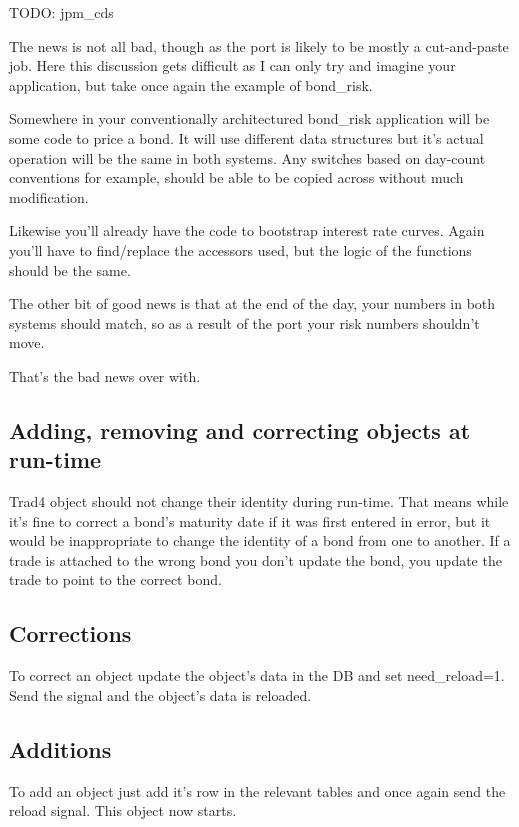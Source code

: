 \documentclass{report}
\begin{document}
TODO: jpm_cds

The news is not all bad, though as the port is likely to be mostly a cut-and-paste job. Here this discussion gets difficult as I can only try and imagine your application, but take once again the example of bond_risk.

Somewhere in your conventionally architectured bond_risk application will be some code to price a bond. It will use different data structures but it's actual operation will be the same in both systems. Any 
switches based on day-count conventions for example, should be able to be copied across without much modification.

Likewise you'll already have the code to bootstrap interest rate curves. Again you'll have to find/replace the accessors used, but the logic of the functions should be the same.

The other bit of good news is that at the end of the day, your numbers in both systems should match, so as a result of the port your risk numbers shouldn't move.

That's the bad news over with.

\subsection{Adding, removing and correcting objects at run-time}

Trad4 object should not change their identity during run-time. That means while it's fine to correct a bond's maturity date if it was first entered in error, but it would be inappropriate to change the identity of a bond from one to another. If a trade is attached to the wrong bond you don't update the bond, you update the trade to point to the correct bond.

\subsection{Corrections}

To correct an object update the object's data in the DB and set need_reload=1. Send the signal and the object's data is reloaded.

\subsection{Additions}

To add an object just add it's row in the relevant tables and once again send the reload signal. This object now starts. 
\end{document}
